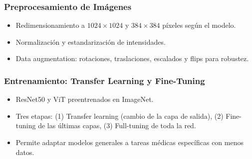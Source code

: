 \begin{frame}
\frametitle{Preprocesamiento de Imágenes}
\begin{itemize}
    \item Redimensionamiento a $1024 \times 1024$ y $384 \times 384$ píxeles según el modelo.
    \item Normalización y estandarización de intensidades.
    \item Data augmentation: rotaciones, traslaciones, escalados y flips para robustez.
\end{itemize}
\end{frame}

\begin{frame}
\frametitle{Entrenamiento: Transfer Learning y Fine-Tuning}
\begin{itemize}
    \item ResNet50 y ViT preentrenados en ImageNet.
    \item Tres etapas: (1) Transfer learning (cambio de la capa de salida), (2) Fine-tuning de las últimas capas, (3) Full-tuning de toda la red.
    \item Permite adaptar modelos generales a tareas médicas específicas con menos datos.
\end{itemize}
\end{frame}

